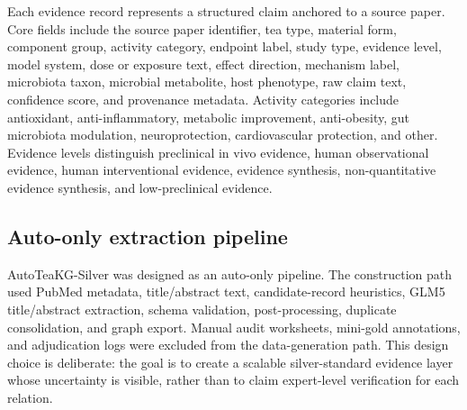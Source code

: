 \documentclass[11pt]{article}
\begin{document}
Each evidence record represents a structured claim anchored to a source paper. Core fields include the source paper identifier, tea type, material form, component group, activity category, endpoint label, study type, evidence level, model system, dose or exposure text, effect direction, mechanism label, microbiota taxon, microbial metabolite, host phenotype, raw claim text, confidence score, and provenance metadata. Activity categories include antioxidant, anti-inflammatory, metabolic improvement, anti-obesity, gut microbiota modulation, neuroprotection, cardiovascular protection, and other. Evidence levels distinguish preclinical in vivo evidence, human observational evidence, human interventional evidence, evidence synthesis, non-quantitative evidence synthesis, and low-preclinical evidence.

\subsection{Auto-only extraction pipeline}

AutoTeaKG-Silver was designed as an auto-only pipeline. The construction path used PubMed metadata, title/abstract text, candidate-record heuristics, GLM5 title/abstract extraction, schema validation, post-processing, duplicate consolidation, and graph export. Manual audit worksheets, mini-gold annotations, and adjudication logs were excluded from the data-generation path. This design choice is deliberate: the goal is to create a scalable silver-standard evidence layer whose uncertainty is visible, rather than to claim expert-level verification for each relation.
\end{document}
